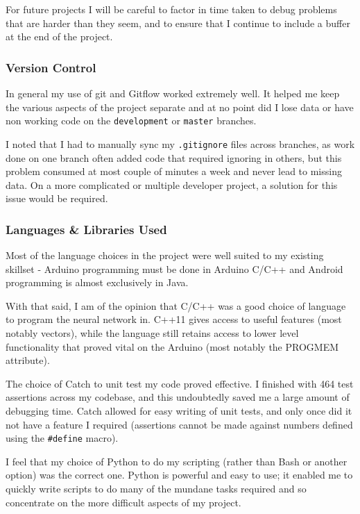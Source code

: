 \documentclass[a4paper]{article}
\begin{document}
For future projects I will be careful to factor in time taken to debug problems that are harder than they seem, and to ensure that I continue to include a buffer at the end of the project.

\subsubsection{Version Control}
\label{subsubsec:ev_pm_versioncontrol}

In general my use of git and Gitflow worked extremely well. It helped me keep the various aspects of the project separate and at no point did I lose data or have non working code on the \lstinline{development} or \lstinline{master} branches. 

I noted that I had to manually sync my \lstinline{.gitignore} files across branches, as work done on one branch often added code that required ignoring in others, but this problem consumed at most couple of minutes a week and never lead to missing data. On a more complicated or multiple developer project, a solution for this issue would be required.

\subsubsection{Languages \& Libraries Used}
\label{subsubsec:ev_pm_languages}

Most of the language choices in the project were well suited to my existing skillset - Arduino programming must be done in Arduino C/C++ and Android programming is almost exclusively in Java. 

With that said, I am of the opinion that C/C++ was a good choice of language to program the neural network in. C++11 gives access to useful features (most notably vectors), while the language still retains access to lower level functionality that proved vital on the Arduino (most notably the PROGMEM attribute).

The choice of Catch to unit test my code proved effective. I finished with 464 test assertions across my codebase, and this undoubtedly saved me a large amount of debugging time. Catch allowed for easy writing of unit tests, and only once did it not have a feature I required (assertions cannot be made against numbers defined using the \lstinline{#define} macro).

I feel that my choice of Python to do my scripting (rather than Bash or another option) was the correct one. Python is powerful and easy to use; it enabled me to quickly write scripts to do many of the mundane tasks required and so concentrate on the more difficult aspects of my project. 
\end{document}
